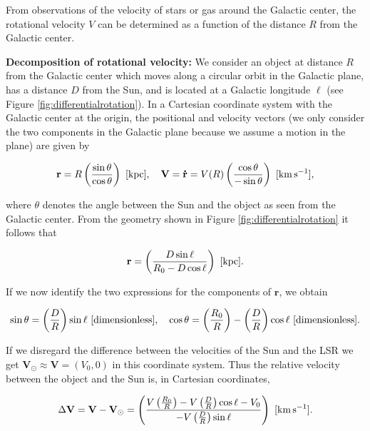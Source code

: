 \documentclass[a4paper,10pt]{article}
\begin{document}
From observations of the velocity of stars or gas around the Galactic center, the rotational velocity $V$ can be determined as a function of the distance $R$ from the Galactic center.

{\noindent}\textbf{Decomposition of rotational velocity:} We consider an object at distance $R$ from the Galactic center which moves along a circular orbit in the Galactic plane, has a distance $D$ from the Sun, and is located at a Galactic longitude $\ell$ (see Figure \ref{fig:differentialrotation}). In a Cartesian coordinate system with the Galactic center at the origin, the positional and velocity vectors (we only consider the two components in the Galactic plane because we assume a motion in the plane) are given by

\begin{align*}
    \mathbf{r} = R\left(\frac{\sin\theta}{\cos\theta}\right) ~ [{\rm kpc}], ~~~ \mathbf{V} = \mathbf{\dot{r}} = V(R)\left(\frac{\cos\theta}{-\sin\theta}\right) ~ [{\rm km\,s^{-1}}],
\end{align*}

{\noindent}where $\theta$ denotes the angle between the Sun and the object as seen from the Galactic center. From the geometry shown in Figure \ref{fig:differentialrotation} it follows that

\begin{align*}
    \mathbf{r} = \left(\frac{D\sin\ell}{R_0-D\cos\ell}\right) ~ [{\rm kpc}].
\end{align*}

{\noindent}If we now identify the two expressions for the components of $\mathbf{r}$, we obtain

\begin{align*}
    \sin\theta=\left(\frac{D}{R}\right)\sin\ell ~ [{\rm dimensionless}], ~~~ \cos\theta=\left(\frac{R_0}{R}\right) - \left(\frac{D}{R}\right)\cos\ell ~ [{\rm dimensionless}].
\end{align*}

{\noindent}If we disregard the difference between the velocities of the Sun and the LSR we get $\mathbf{V}_\odot\approx\mathbf{V} = (V_0,0)$ in this coordinate system. Thus the relative velocity between the object and the Sun is, in Cartesian coordinates,

\begin{align*}
    \Delta\mathbf{V} = \mathbf{V}-\mathbf{V}_\odot = \left(\frac{V\left(\frac{R_0}{R}\right) - V\left(\frac{D}{R}\right)\cos\ell - V_0}{-V\left(\frac{D}{R}\right)\sin\ell}\right) ~ [{\rm km\,s^{-1}}].
\end{align*}
\end{document}
